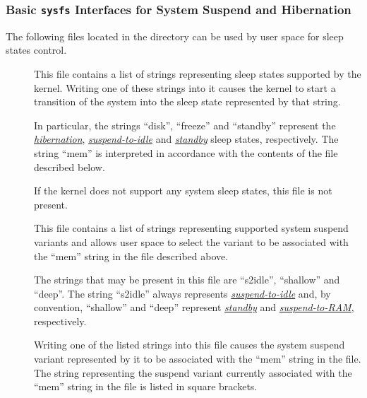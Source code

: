\documentclass[a4paper,8pt,english]{sphinxmanual}
\begin{document}
\subsubsection{Basic \texttt{sysfs} Interfaces for System Suspend and Hibernation}
\label{admin-guide/pm/sleep-states:basic-sysfs-interfaces-for-system-suspend-and-hibernation}
The following files located in the  directory can be used by
user space for sleep states control.
\begin{description}
\item[{}] \leavevmode
This file contains a list of strings representing sleep states supported
by the kernel.  Writing one of these strings into it causes the kernel
to start a transition of the system into the sleep state represented by
that string.

In particular, the strings ``disk'', ``freeze'' and ``standby'' represent the
{\hyperref[admin\string-guide/pm/sleep\string-states:hibernation]{\emph{hibernation}}}, {\hyperref[admin\string-guide/pm/sleep\string-states:s2idle]{\emph{suspend-to-idle}}} and
{\hyperref[admin\string-guide/pm/sleep\string-states:standby]{\emph{standby}}} sleep states, respectively.  The string ``mem''
is interpreted in accordance with the contents of the  file
described below.

If the kernel does not support any system sleep states, this file is
not present.

\item[{}] \leavevmode
This file contains a list of strings representing supported system
suspend variants and allows user space to select the variant to be
associated with the ``mem'' string in the  file described above.

The strings that may be present in this file are ``s2idle'', ``shallow''
and ``deep''.  The string ``s2idle'' always represents {\hyperref[admin\string-guide/pm/sleep\string-states:s2idle]{\emph{suspend-to-idle}}} and, by convention, ``shallow'' and ``deep'' represent
{\hyperref[admin\string-guide/pm/sleep\string-states:standby]{\emph{standby}}} and {\hyperref[admin\string-guide/pm/sleep\string-states:s2ram]{\emph{suspend-to-RAM}}},
respectively.

Writing one of the listed strings into this file causes the system
suspend variant represented by it to be associated with the ``mem'' string
in the  file.  The string representing the suspend variant
currently associated with the ``mem'' string in the  file
is listed in square brackets.


\end{description}
\end{document}
